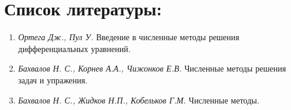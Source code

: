 \documentclass[a4paper,11.9pt]{article}
\begin{document}
\begin{figure}[h]
    \label{fig:image}
\end{figure}

\newpage

\section*{ Список литературы:} 
 \begin{enumerate}
     \item \textit{Ортега Дж., Пул У.} Введение в численные методы решения дифференциальных уравнений.
     \item \textit{Бахвалов Н. С., Корнев А.А., Чижонков Е.В. } Численные методы решения задач и упражения.
     \item \textit{Бахвалов Н. С., Жидков Н.П., Кобельков Г.М. } Численные методы.
 \end{enumerate}
\end{document}
